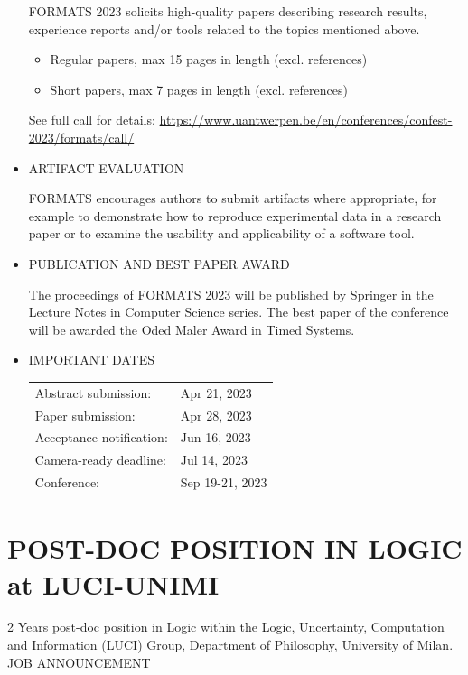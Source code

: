 \documentclass[prodmode,acmtecs]{acmsmall} %
\begin{document}
\begin{itemize}
  FORMATS 2023 solicits high-quality papers describing research results, experience reports and/or tools related to the topics mentioned above.  
 
\begin{itemize}\item  Regular papers, max 15 pages in length (excl. references)
\item  Short papers, max 7 pages in length (excl. references)
\end{itemize} 
  See full call for details: \href{https://www.uantwerpen.be/en/conferences/confest-2023/formats/call/}{https://www.uantwerpen.be/en/conferences/confest-2023/formats/call/} 
 
\item  ARTIFACT EVALUATION  
 
   FORMATS encourages authors to submit artifacts where appropriate, for example to demonstrate how to reproduce experimental data in a research paper or to examine the usability and applicability of a software tool.  
 
\item  PUBLICATION AND BEST PAPER AWARD 
 
  The proceedings of FORMATS 2023 will be published by Springer in the Lecture Notes in Computer Science series. The best paper of the conference will be awarded the Oded Maler Award in Timed Systems. 
 
\item  IMPORTANT DATES 
 
\begin{tabulary}{\linewidth}{LL}Abstract submission:  & Apr 21, 2023 \\
Paper submission:  & Apr 28, 2023 \\
Acceptance notification:  & Jun 16, 2023 \\
Camera-ready deadline:  & Jul 14, 2023 \\
Conference:  & Sep 19-21, 2023 \\
\end{tabulary}
 
\end{itemize}\section{POST-DOC POSITION IN LOGIC at LUCI-UNIMI}\label{POSTDOCPOSITIONINLOGICatLUCIUNIMI}  2 Years post-doc position in Logic within the Logic, Uncertainty, Computation and Information (LUCI) Group, Department of Philosophy, University of Milan.\\ 
JOB ANNOUNCEMENT 
\end{document}
